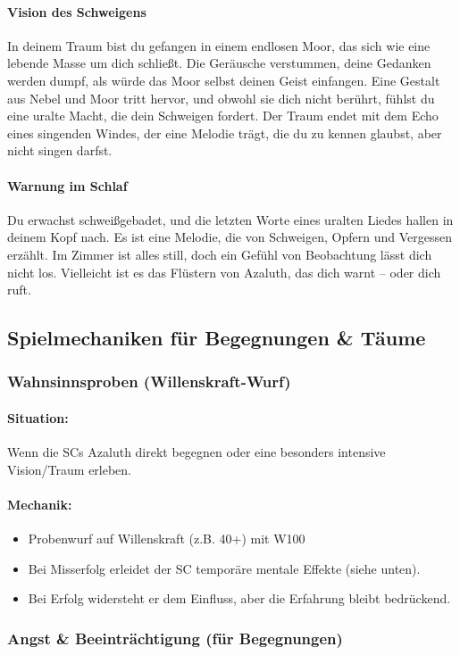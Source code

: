 \paragraph{Vision des Schweigens}
In deinem Traum bist du gefangen in einem endlosen Moor, das sich wie eine lebende Masse um dich schließt.
Die Geräusche verstummen, deine Gedanken werden dumpf, als würde das Moor selbst deinen Geist einfangen.
Eine Gestalt aus Nebel und Moor tritt hervor, und obwohl sie dich nicht berührt, fühlst du eine uralte Macht, die dein Schweigen fordert.
Der Traum endet mit dem Echo eines singenden Windes, der eine Melodie trägt, die du zu kennen glaubst, aber nicht singen darfst.
\paragraph{Warnung im Schlaf}
Du erwachst schweißgebadet, und die letzten Worte eines uralten Liedes hallen in deinem Kopf nach.
Es ist eine Melodie, die von Schweigen, Opfern und Vergessen erzählt.
Im Zimmer ist alles still, doch ein Gefühl von Beobachtung lässt dich nicht los.
Vielleicht ist es das Flüstern von Azaluth, das dich warnt – oder dich ruft.
\newpage
\subsection{Spielmechaniken für Begegnungen \& Täume}
\subsubsection*{Wahnsinnsproben (Willenskraft-Wurf)}
\paragraph{Situation:}
Wenn die SCs Azaluth direkt begegnen oder eine besonders intensive Vision/Traum erleben.
\paragraph{Mechanik:}
\begin{itemize}
\item Probenwurf auf Willenskraft (z.B. 40+) mit W100
\item Bei Misserfolg erleidet der SC temporäre mentale Effekte (siehe unten).
\item Bei Erfolg widersteht er dem Einfluss, aber die Erfahrung bleibt bedrückend.
\end{itemize}

\subsubsection*{Angst \& Beeinträchtigung (für Begegnungen)}

